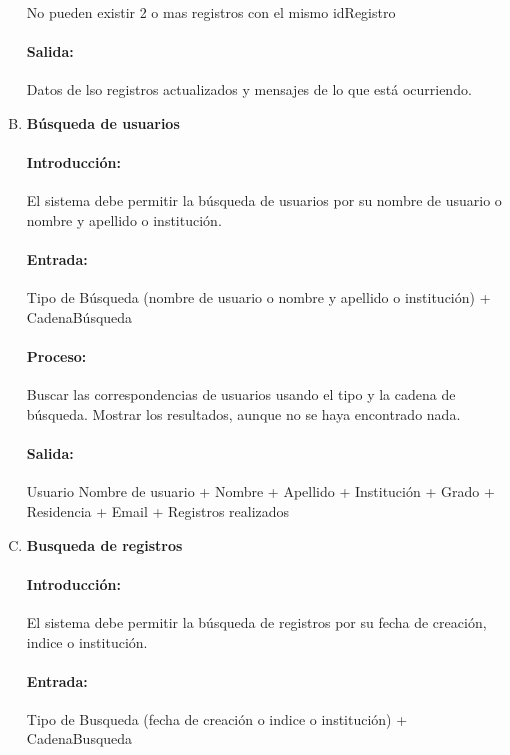 \begin{enumerate}[A.]
        No pueden existir 2 o mas registros con el mismo idRegistro
        
        \paragraph{Salida:} Datos de lso registros actualizados y mensajes de lo que está ocurriendo.
        
          \item \textbf{Búsqueda de usuarios}
        
        \paragraph{Introducción:}El sistema debe permitir la búsqueda de usuarios por su nombre de usuario o nombre y apellido o institución. 
        
        \paragraph{Entrada:} Tipo de Búsqueda (nombre de usuario o nombre y apellido o institución) + CadenaBúsqueda
        
        \paragraph{Proceso:} Buscar las correspondencias de usuarios usando el tipo y la cadena de búsqueda. Mostrar los resultados, aunque no se haya encontrado nada.
        
        \paragraph{Salida:} Usuario {Nombre de usuario + Nombre + Apellido + Institución + Grado + Residencia + Email + Registros realizados}
        
         \item \textbf{Busqueda de registros}
        
        \paragraph{Introducción:} El sistema debe permitir la búsqueda de registros por su fecha de creación, indice o institución.
        \paragraph{Entrada:} Tipo de Busqueda (fecha de creación o indice o institución) + CadenaBusqueda
        

\end{enumerate}
